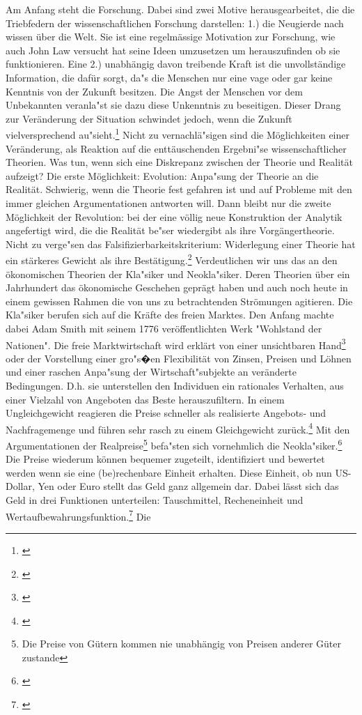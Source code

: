 \documentclass[
        onecolumn,
        a4paper,
        abstracton,
        parskip=half
        ,final
        ]{scrartcl}
\begin{document}
Am Anfang steht die Forschung. Dabei sind zwei Motive herausgearbeitet, die die Triebfedern der wissenschaftlichen Forschung darstellen:
1.) die Neugierde nach wissen {\"u}ber die Welt. Sie ist eine regelm{\"a}ssige Motivation zur Forschung, wie auch John Law versucht hat seine Ideen umzusetzen um herauszufinden ob sie funktionieren.
Eine 2.) unabh{\"a}ngig davon treibende Kraft ist die unvollst{\"a}ndige Information, die daf{\"u}r sorgt, da{"s} die Menschen nur eine vage oder gar keine Kenntnis von der Zukunft besitzen. Die Angst der Menschen vor dem Unbekannten veranla{"s}t sie dazu diese Unkenntnis zu beseitigen. Dieser Drang zur Ver{\"a}nderung der Situation schwindet jedoch, wenn die Zukunft vielversprechend au{"s}ieht.\footnote[101]{ \citep*[S.11]{bombach1981theorie}} Nicht zu vernachl{\"a}{"s}igen sind die M{\"o}glichkeiten einer Ver{\"a}nderung, als Reaktion auf die entt{\"a}uschenden Ergebni{"s}e wissenschaftlicher Theorien. Was tun, wenn sich eine Diskrepanz zwischen der Theorie und Realit{\"a}t aufzeigt? Die erste M{\"o}glichkeit: Evolution: Anpa{"s}ung der Theorie an die Realit{\"a}t. Schwierig, wenn die Theorie fest gefahren ist und auf Probleme mit den immer gleichen Argumentationen antworten will. Dann bleibt nur die zweite M{\"o}glichkeit der Revolution: bei der eine v{\"o}llig neue Konstruktion der Analytik angefertigt wird, die die Realit{\"a}t be{"s}er wiedergibt als ihre Vorg{\"a}ngertheorie. Nicht zu verge{"s}en das Falsifizierbarkeitskriterium: Widerlegung einer Theorie hat ein st{\"a}rkeres Gewicht als ihre Best{\"a}tigung.\footnote[102]{\citep*[S.161]{bombach1981theorie}} Verdeutlichen wir uns das an den {\"o}konomischen Theorien der Kla{"s}iker und Neokla{"s}iker. Deren Theorien {\"u}ber ein Jahrhundert das {\"o}konomische Geschehen gepr{\"a}gt haben und auch noch heute in einem gewissen Rahmen die von uns zu betrachtenden Str{\"o}mungen agitieren. Die Kla{"s}iker berufen sich auf die Kr{\"a}fte des freien Marktes. Den Anfang machte dabei Adam Smith mit seinem 1776 ver{\"o}ffentlichten Werk "Wohlstand der Nationen". Die freie Marktwirtschaft wird erkl{\"a}rt von einer unsichtbaren Hand\footnote[103]{\citep*[S.137]{bombach1981theorie}} oder der Vorstellung einer gro{"s}�en Flexibilit{\"a}t von Zinsen, Preisen und L{\"o}hnen und einer raschen Anpa{"s}ung der Wirtschaft{"s}ubjekte an ver{\"a}nderte Bedingungen. D.h. sie unterstellen den Individuen ein rationales Verhalten, aus einer Vielzahl von Angeboten das Beste herauszufiltern. In einem Ungleichgewicht reagieren die Preise schneller als realisierte Angebots- und Nachfragemenge und f{\"u}hren sehr rasch zu einem Gleichgewicht zur{\"u}ck.\footnote[104]{\citep*[S.291]{Basseler2010}} Mit den Argumentationen der Realpreise\footnote[105]{Die Preise von G{\"u}tern kommen nie unabh{\"a}ngig von Preisen anderer G{\"u}ter zustande} befa{"s}ten sich vornehmlich die Neokla{"s}iker.\footnote[106]{\citep*[S.138]{bombach1981theorie}} Die Preise wiederum k{\"o}nnen bequemer zugeteilt, identifiziert und bewertet werden wenn sie eine (be)rechenbare Einheit erhalten. Diese Einheit, ob nun US-Dollar, Yen oder Euro stellt das Geld ganz allgemein dar. Dabei l{\"a}sst sich das Geld in drei Funktionen unterteilen: Tauschmittel, Recheneinheit und Wertaufbewahrungsfunktion.\footnote[107]{\citep*[S.417]{Basseler2010}} Die 
\end{document}
